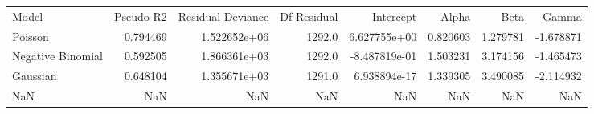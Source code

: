 \begin{tabular}{lrrrrrrr}
\toprule
             Model &  Pseudo R2 &  Residual Deviance &  Df Residual &     Intercept &     Alpha &      Beta &     Gamma \\
           Poisson &   0.794469 &       1.522652e+06 &       1292.0 &  6.627755e+00 &  0.820603 &  1.279781 & -1.678871 \\
\midrule
 Negative Binomial &   0.592505 &       1.866361e+03 &       1292.0 & -8.487819e-01 &  1.503231 &  3.174156 & -1.465473 \\
          Gaussian &   0.648104 &       1.355671e+03 &       1291.0 &  6.938894e-17 &  1.339305 &  3.490085 & -2.114932 \\
               NaN &        NaN &                NaN &          NaN &           NaN &       NaN &       NaN &       NaN \\
\bottomrule
\end{tabular}


